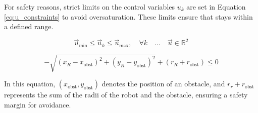 \documentclass[conference]{IEEEtran}
\begin{document}

For safety reasons, strict limits on the control variables \(u_k\) are set in Equation \ref{eq:u_constraints} to avoid oversaturation. These limits ensure that stays within a defined range.



\begin{equation}
\label{eq:u_constraints}
\vec{u}_{\text{min}} \leq \vec{u}_k \leq \vec{u}_{\text{max}}, \quad \forall k \quad \text{…} \quad \vec{u} \in \mathbb{R}^2
\end{equation}


\begin{equation}
\label{eq:collision_condition}
-\sqrt{(x_R - x_{\text{obst}})^2 + (y_R - y_{\text{obst}})^2} + (r_R + r_{\text{obst}}) \leq 0
\end{equation}

In this equation, \( (x_{\text{obst}}, y_{\text{obst}}) \) denotes the position of an obstacle, and \( r_r + r_{\text{obst}}\) represents the sum of the radii of the robot and the obstacle, ensuring a safety margin for avoidance. 

{\small


}


\clearpage 
\end{document}
